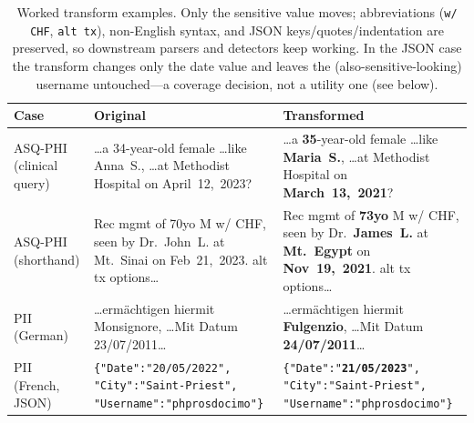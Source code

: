 \documentclass[pmlr,twocolumn,10pt]{jmlr}
\newcommand{\oldv}[1]{\textcolor{cclay}{#1}}
\newcommand{\newv}[1]{\textcolor{caccent}{\textbf{#1}}}
\newcommand{\tp}[1]{\texttt{#1}}
\begin{document}
\begin{table}[tbp]\centering\small
\begin{tabular}{p{2.3cm}p{6.0cm}p{6.0cm}}
\toprule
Case & Original & Transformed\\
\midrule
ASQ-PHI (clinical query) & \dots a \oldv{34}-year-old female \dots like \oldv{Anna~S.}, \dots at Methodist Hospital on \oldv{April~12,~2023}? & \dots a \newv{35}-year-old female \dots like \newv{Maria~S.}, \dots at Methodist Hospital on \newv{March~13,~2021}?\\
\addlinespace
ASQ-PHI (shorthand) & Rec mgmt of \oldv{70yo} M w/ CHF, seen by Dr.~\oldv{John~L.} at \oldv{Mt.~Sinai} on \oldv{Feb~21,~2023}. alt tx options\dots & Rec mgmt of \newv{73yo} M w/ CHF, seen by Dr.~\newv{James~L.} at \newv{Mt.~Egypt} on \newv{Nov~19,~2021}. alt tx options\dots\\
\addlinespace
PII (German) & \dots erm\"achtigen hiermit \oldv{Monsignore}, \dots Mit Datum \oldv{23/07/2011}\dots & \dots erm\"achtigen hiermit \newv{Fulgenzio}, \dots Mit Datum \newv{24/07/2011}\dots\\
\addlinespace
PII (French, JSON) & \tp{\{"Date":"\oldv{20/05/2022}", "City":"Saint-Priest", "Username":"phprosdocimo"\}} & \tp{\{"Date":"\newv{21/05/2023}", "City":"Saint-Priest", "Username":"phprosdocimo"\}}\\
\bottomrule
\end{tabular}
\caption{Worked transform examples. Only the sensitive value moves; abbreviations (\tp{w/ CHF}, \tp{alt tx}), non-English syntax, and JSON keys/quotes/indentation are preserved, so downstream parsers and detectors keep working. In the JSON case the transform changes only the date value and leaves the (also-sensitive-looking) username untouched---a coverage decision, not a utility one (see below).}\label{tab:examples}
\end{table}
\end{document}
